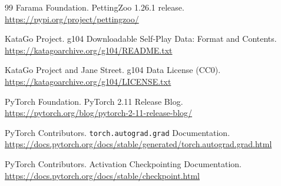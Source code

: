 \documentclass[UTF8,11pt,a4paper]{ctexart}
\newcommand{\code}[1]{\texttt{#1}}
\begin{document}
\begin{thebibliography}{99}
Farama Foundation.
\newblock PettingZoo 1.26.1 release.
\newblock \url{https://pypi.org/project/pettingzoo/}

KataGo Project.
\newblock g104 Downloadable Self-Play Data: Format and Contents.
\newblock \url{https://katagoarchive.org/g104/README.txt}

KataGo Project and Jane Street.
\newblock g104 Data License (CC0).
\newblock \url{https://katagoarchive.org/g104/LICENSE.txt}

PyTorch Foundation.
\newblock PyTorch 2.11 Release Blog.
\newblock \url{https://pytorch.org/blog/pytorch-2-11-release-blog/}

PyTorch Contributors.
\newblock \code{torch.autograd.grad} Documentation.
\newblock \url{https://docs.pytorch.org/docs/stable/generated/torch.autograd.grad.html}

PyTorch Contributors.
\newblock Activation Checkpointing Documentation.
\newblock \url{https://docs.pytorch.org/docs/stable/checkpoint.html}

\end{thebibliography}
\end{document}

